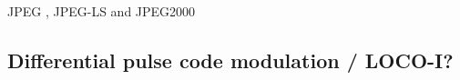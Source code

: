 




      JPEG \cite{pennebaker_jpeg:_1992}, JPEG-LS \cite{weinberger_loco-i_2000} and JPEG2000 \cite{adams_jpeg-2000_2001}
      


  \subsection{Differential pulse code modulation / LOCO-I?}

  


